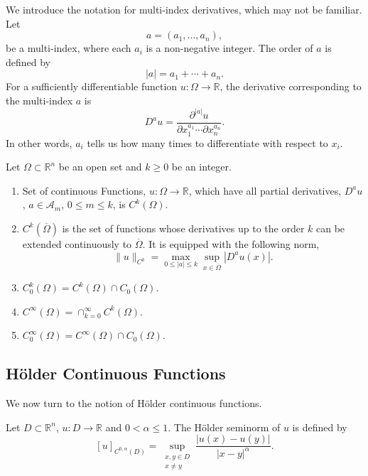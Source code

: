 \begin{remark}
    We introduce the notation for multi-index derivatives, which may not
    be familiar. Let
    \[
        a=(a_1,\dots,a_n),
    \]
    be a multi-index, where each $a_i$ is a non-negative integer. The
    order of $a$ is defined by
    \[
        |a|=a_1+\cdots+a_n.
    \]
    For a sufficiently differentiable function $u:\Omega\to\mathbb{R}$,
    the derivative corresponding to the multi-index $a$ is
    \[
        D^a u
        =
        \frac{\partial^{|a|}u}
        {\partial x_1^{a_1}\cdots\partial x_n^{a_n}}.
    \]
    In other words, $a_i$ tells us how many times to differentiate with
    respect to $x_i$.
\end{remark}

\begin{definition}
    Let $\Omega \subset \mathbb{R}^n$ be an open set and $k\geq0$ be an integer.
    \begin{enumerate}
        \item[(i)] Set of continuous Functions, $u : \Omega \rightarrow \mathbb{R}$, which have all partial derivatives, $D^a u$, $a \in \mathcal{A}_m$, $0 \leq m \leq k$, is $C^k(\Omega)$.
        \item[(ii)] $C^k(\overline{\Omega})$ is the set of functions whose derivatives up to the order $k$ can be extended continuously to $\overline{\Omega}$. It is equipped with the following norm, 
        \[
        \|u\|_{C^k} = \max_{0\leq|a|\leq k} \sup_{x\in\overline{\Omega}}|D^a u(x)|.
        \]
        \item[(iii)]  $C^k_0(\Omega) = C^k(\Omega)\cap C_0(\Omega)$.

        \item[(iv)]  $C^\infty(\Omega) = \cap_{k=0}^{\infty} C^k(\Omega)$.

        \item[(v)]  $C^\infty_0(\Omega) = C^\infty(\Omega) \cap C_0(\Omega)$.
    \end{enumerate}
\end{definition}

\subsection{H\"older Continuous Functions}

We now turn to the notion of H\"older continuous functions.

\begin{definition}
    \label{def:Holder Semi Norm}
    Let $D \subset \mathbb{R}^n$, $u:D\rightarrow\mathbb{R}$ and
    $0<\alpha\leq1$. The H\"older seminorm of $u$ is defined by
    \[
        [u]_{C^{0,\alpha}(D)}
        =
        \sup_{\substack{x,y\in D\\x\neq y}}
        \frac{|u(x)-u(y)|}{|x-y|^\alpha}.
    \]
\end{definition}

